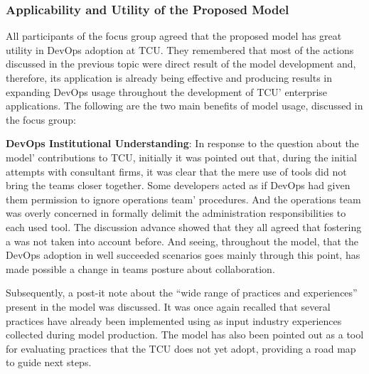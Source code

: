 \subsubsection{Applicability and Utility of the Proposed Model}

{
\color{blue}
All participants of the focus group agreed that the proposed model has great
utility in DevOps adoption at TCU. They remembered that most of the actions
discussed in the previous topic were direct result of the model development and,
therefore, its application is already being effective and producing results in
expanding DevOps usage throughout the development of TCU' enterprise applications.
The following are the two main benefits of model usage, discussed in the focus
group:

\textbf{DevOps Institutional Understanding}: In response to the question about
the model' contributions to TCU, initially it was pointed out that, during the
initial attempts with consultant firms, it was clear that the mere use of
tools did not bring the teams closer together. Some developers acted as if DevOps
had given them permission to ignore operations team' procedures. And the
operations team was overly concerned in formally delimit the administration
responsibilities to each used tool. The discussion advance showed that they all
agreed that fostering a \cc was not taken into account before. And seeing,
throughout the model, that the DevOps adoption in well succeeded scenarios goes
mainly through this point, has made possible a change in teams posture about
collaboration.

Subsequently, a post-it note about the ``wide range of practices and experiences''
present in the model was discussed. It was once again recalled that several
practices have already been implemented using as input industry experiences
collected during model production. The model has also been pointed out as a tool
for evaluating practices that the TCU does not yet adopt, providing a road map
to guide next steps.
}

